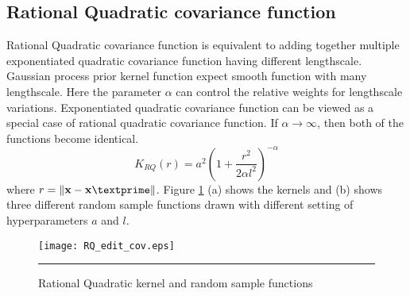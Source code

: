 \subsection{Rational Quadratic covariance function}

Rational Quadratic covariance function is equivalent to adding together multiple
exponentiated quadratic covariance function having different lengthscale.
Gaussian process prior kernel function expect smooth function with many lengthscale.
Here the parameter $\alpha$ can control the relative weights for lengthscale variations.
Exponentiated quadratic covariance function can be viewed as a special case of rational quadratic 
covariance function. If $\alpha \to \infty$, then both of the functions become identical.
\begin{equation} \label{eq:RQ_cov}
K_{RQ}(r)= a^2 \left(1+ \frac{r^2}{2 \alpha l^2}\right)^{-\alpha}
\end{equation}
where $r=\lVert \textbf{x}-\textbf{x}\textprime \rVert$. 
Figure \ref{fig:Rational_Quadratic_covariance} (a) shows the kernels and (b) shows
three different random sample functions drawn with different setting of hyperparameters 
$a$ and $l$.

\begin{figure}[t]
	\centering
		\texttt{[image: RQ\_edit\_cov.eps]}
		\rule{35em}{0.5pt}
	\caption[Rational Quadratic kernel and random sample functions]
		{Rational Quadratic kernel and random sample functions}
	\label{fig:Rational_Quadratic_covariance}
\end{figure}

